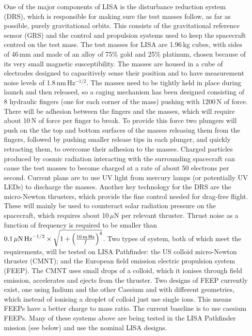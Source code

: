 \documentclass{article}
\begin{document}
One of the major components of LISA is the disturbance reduction system (DRS),
which is responsible for making sure the test masses follow, as far as
possible, purely gravitational orbits. This consists of the gravitational
reference sensor (GRS) and the control and propulsion systems used to keep the
spacecraft centred on the test mass. The test masses for LISA are 1.96\,kg
cubes, with sides of 46\,mm and made of an alloy of 75\% gold and 25\% platinum,
chosen because of its very small magnetic susceptibility. The masses are housed
in a cube of electrodes designed to capacitively sense their position and
to have measurement noise levels of 1.8\,nm\,Hz$^{-1/2}$. The masses need to be
tightly held in place during launch and then released, so a caging mechanism
has been designed consisting of 8 hydraulic fingers (one for each corner of the
mass) pushing with 1200\,N of force. There will be adhesion between the fingers
and the masses, which will require about 10\,N of force per finger to break. To
provide this force two plungers will push on the the top and bottom surfaces of
the masses releasing them from the fingers, followed by pushing smaller release
tips in each plunger, and quickly retracting them, to overcome their adhesion to
the masses. Charged particles produced by cosmic radiation interacting with the
surrounding spacecraft can cause the test masses to become charged at a rate of
about 50 electrons per second. Current plans are to use UV light from mercury
lamps (or potentially UV LEDs) to discharge the masses. Another key technology
for the DRS are the micro-Newton thrusters, which provide the fine control
needed for drag-free flight. These will mainly be used to counteract solar
radiation pressure on the spacecraft, which requires about 10\,$\mu$N per
relevant thruster. Thrust noise as a function of frequency is required to be
smaller than $0.1\,\mu{\rm N}\,{\rm Hz}^{-1/2}\times\sqrt{1 +
\left(\frac{10\,{\rm m}\,{\rm Hz}}{f}\right)^4}$. Two types of system, both of
which meet the requirements, will be tested on LISA Pathfinder: the US colloid
micro-Newton thruster (CMNT); and the European field emission electric
propulsion system (FEEP). The CMNT uses small drops of a colloid, which it
ionises through field emission, accelerates and ejects from the thruster. Two
designs of FEEP currently exist, one using Indium and the other Caesium and with
different geometries, which instead of ionising a droplet of colloid just use
single ions. This means FEEPs have a better charge to mass ratio. The current
baseline is to use caesium FEEPs. Many of these systems above are being tested
in the LISA Pathfinder mission (see below) and use the nominal LISA designs.
\end{document}
